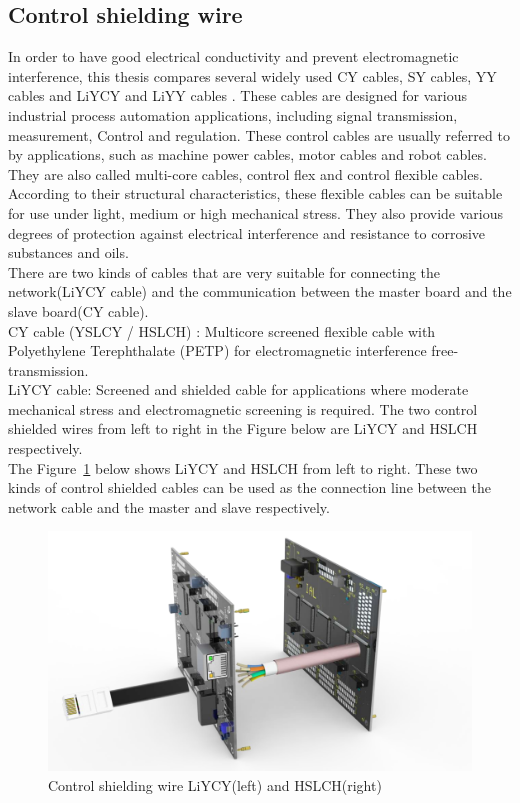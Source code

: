 \subsection{Control shielding wire}
\label{sec:Control shielding wire}
In order to have good electrical conductivity and prevent electromagnetic interference, this thesis compares several widely used CY cables, SY cables, YY cables and LiYCY and LiYY cables \cite{controlcables2021}. These cables are designed for various industrial process automation applications, including signal transmission, measurement, Control and regulation. These control cables are usually referred to by applications, such as machine power cables, motor cables and robot cables. They are also called multi-core cables, control flex and control flexible cables.
\\
According to their structural characteristics, these flexible cables can be suitable for use under light, medium or high mechanical stress. They also provide various degrees of protection against electrical interference and resistance to corrosive substances and oils.
\\
There are two kinds of cables that are very suitable for connecting the network(LiYCY cable) and the communication between the master board and the slave board(CY cable).
\\
CY cable (YSLCY / HSLCH) : Multicore screened flexible cable with Polyethylene Terephthalate (PETP) for electromagnetic interference free-transmission.
\\
LiYCY cable: Screened and shielded cable for applications where moderate mechanical stress and electromagnetic screening is required.
The two control shielded wires from left to right in the Figure below are LiYCY and HSLCH respectively.
\\
The Figure~\ref{fig:5.4} below shows LiYCY and HSLCH from left to right. These two kinds of control shielded cables can be used as the connection line between the network cable and the master and slave respectively.
\begin{figure}[!ht]
	\centering
	\includegraphics[width=16cm]{grafiken/5.4.pdf}
	\caption{Control shielding wire LiYCY(left) and HSLCH(right)} 
	\label{fig:5.4}
\end{figure}
\FloatBarrier
\\

